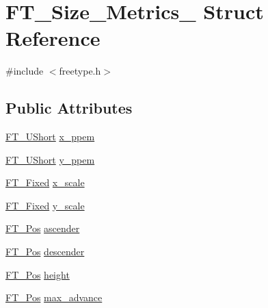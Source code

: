 \hypertarget{struct_f_t___size___metrics__}{\section{F\-T\-\_\-\-Size\-\_\-\-Metrics\-\_\- Struct Reference}
\label{struct_f_t___size___metrics__}
}


{\ttfamily \#include $<$freetype.\-h$>$}

\subsection*{Public Attributes}
\begin{DoxyCompactItemize}
\item 
\hyperlink{fttypes_8h_a937f6c17cf5ffd09086d8610c37b9f58}{F\-T\-\_\-\-U\-Short} \hyperlink{struct_f_t___size___metrics___abb42b175a3450e9d8b84483f166d6c8a}{x\-\_\-ppem}
\item 
\hyperlink{fttypes_8h_a937f6c17cf5ffd09086d8610c37b9f58}{F\-T\-\_\-\-U\-Short} \hyperlink{struct_f_t___size___metrics___abcdb70cb9e39a74679bc39c07f3275f7}{y\-\_\-ppem}
\item 
\hyperlink{fttypes_8h_a5f5a679cc09f758efdd0d1c5feed3c3d}{F\-T\-\_\-\-Fixed} \hyperlink{struct_f_t___size___metrics___a5e92028bb9881e107a6fb75d557eaff1}{x\-\_\-scale}
\item 
\hyperlink{fttypes_8h_a5f5a679cc09f758efdd0d1c5feed3c3d}{F\-T\-\_\-\-Fixed} \hyperlink{struct_f_t___size___metrics___a1f8b1cb3538b9920127f721dd061379d}{y\-\_\-scale}
\item 
\hyperlink{ftimage_8h_af5f230f4b253d4c7715fd2e595614c90}{F\-T\-\_\-\-Pos} \hyperlink{struct_f_t___size___metrics___ab5fde60a2661d7b774f61c264a2a6070}{ascender}
\item 
\hyperlink{ftimage_8h_af5f230f4b253d4c7715fd2e595614c90}{F\-T\-\_\-\-Pos} \hyperlink{struct_f_t___size___metrics___a9b2ca3a4391803e8721ed99eb9953d52}{descender}
\item 
\hyperlink{ftimage_8h_af5f230f4b253d4c7715fd2e595614c90}{F\-T\-\_\-\-Pos} \hyperlink{struct_f_t___size___metrics___ae3361e264fb8a9e669f118bdb244439b}{height}
\item 
\hyperlink{ftimage_8h_af5f230f4b253d4c7715fd2e595614c90}{F\-T\-\_\-\-Pos} \hyperlink{struct_f_t___size___metrics___ac315a7a834ac1a57c7169ce021718958}{max\-\_\-advance}
\end{DoxyCompactItemize}


